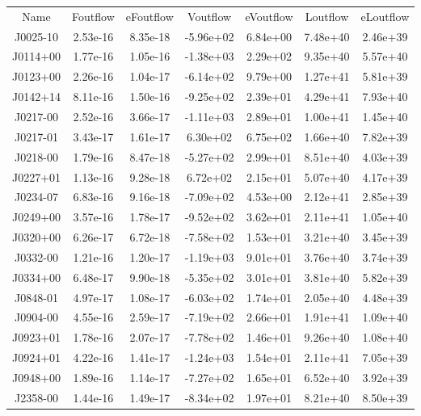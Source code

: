 \begin{table}
\begin{tabular}{ccccccc}
Name & Foutflow & eFoutflow & Voutflow & eVoutflow & Loutflow & eLoutflow \\
J0025-10 & 2.53e-16 & 8.35e-18 & -5.96e+02 & 6.84e+00 & 7.48e+40 & 2.46e+39 \\
J0114+00 & 1.77e-16 & 1.05e-16 & -1.38e+03 & 2.29e+02 & 9.35e+40 & 5.57e+40 \\
J0123+00 & 2.26e-16 & 1.04e-17 & -6.14e+02 & 9.79e+00 & 1.27e+41 & 5.81e+39 \\
J0142+14 & 8.11e-16 & 1.50e-16 & -9.25e+02 & 2.39e+01 & 4.29e+41 & 7.93e+40 \\
J0217-00 & 2.52e-16 & 3.66e-17 & -1.11e+03 & 2.89e+01 & 1.00e+41 & 1.45e+40 \\
J0217-01 & 3.43e-17 & 1.61e-17 & 6.30e+02 & 6.75e+02 & 1.66e+40 & 7.82e+39 \\
J0218-00 & 1.79e-16 & 8.47e-18 & -5.27e+02 & 2.99e+01 & 8.51e+40 & 4.03e+39 \\
J0227+01 & 1.13e-16 & 9.28e-18 & 6.72e+02 & 2.15e+01 & 5.07e+40 & 4.17e+39 \\
J0234-07 & 6.83e-16 & 9.16e-18 & -7.09e+02 & 4.53e+00 & 2.12e+41 & 2.85e+39 \\
J0249+00 & 3.57e-16 & 1.78e-17 & -9.52e+02 & 3.62e+01 & 2.11e+41 & 1.05e+40 \\
J0320+00 & 6.26e-17 & 6.72e-18 & -7.58e+02 & 1.53e+01 & 3.21e+40 & 3.45e+39 \\
J0332-00 & 1.21e-16 & 1.20e-17 & -1.19e+03 & 9.01e+01 & 3.76e+40 & 3.74e+39 \\
J0334+00 & 6.48e-17 & 9.90e-18 & -5.35e+02 & 3.01e+01 & 3.81e+40 & 5.82e+39 \\
J0848-01 & 4.97e-17 & 1.08e-17 & -6.03e+02 & 1.74e+01 & 2.05e+40 & 4.48e+39 \\
J0904-00 & 4.55e-16 & 2.59e-17 & -7.19e+02 & 2.66e+01 & 1.91e+41 & 1.09e+40 \\
J0923+01 & 1.78e-16 & 2.07e-17 & -7.78e+02 & 1.46e+01 & 9.26e+40 & 1.08e+40 \\
J0924+01 & 4.22e-16 & 1.41e-17 & -1.24e+03 & 1.54e+01 & 2.11e+41 & 7.05e+39 \\
J0948+00 & 1.89e-16 & 1.14e-17 & -7.27e+02 & 1.65e+01 & 6.52e+40 & 3.92e+39 \\
J2358-00 & 1.44e-16 & 1.49e-17 & -8.34e+02 & 1.97e+01 & 8.21e+40 & 8.50e+39 \\
\end{tabular}
\end{table}
